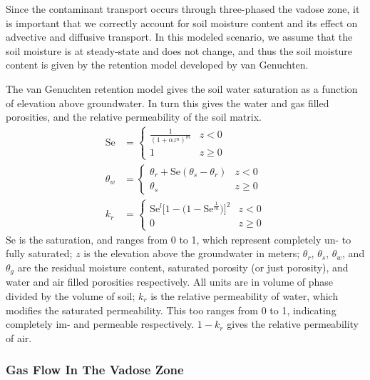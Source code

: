 Since the contaminant transport occurs through three-phased the vadose zone, it is important that we correctly account for soil moisture content and its effect on advective and diffusive transport.
In this modeled scenario, we assume that the soil moisture is at steady-state and does not change, and thus the soil moisture content is given by the retention model developed by van Genuchten.\par

The van Genuchten retention model gives the soil water saturation as a function of elevation above groundwater.
In turn this gives the water and gas filled porosities, and the relative permeability of the soil matrix.
\begin{align}
  \mathrm{Se} &=
    \begin{cases}\label{eq:van_genuchten_saturation}
      \frac{1}{(1 + \alpha z^n)^m} & z < 0 \\
    1 & z \geq 0
    \end{cases} \\
  \theta_w &=
    \begin{cases}\label{eq:van_genuchten_soil_moisture}
      \theta_r + \mathrm{Se}(\theta_s - \theta_r) & z < 0 \\
      \theta_s & z \geq 0
    \end{cases} \\
  k_r &=
    \begin{cases}\label{eq:van_genuchten_relative_permeability}
      \mathrm{Se}^l \big[ 1 - \big( 1 - \mathrm{Se}^\frac{1}{m} \big) \big]^2 & z < 0 \\
      0 & z \geq 0
    \end{cases}
\end{align}
$\mathrm{Se}$ is the saturation, and ranges from 0 to 1, which represent completely un- to fully saturated;
$z$ is the elevation above the groundwater in meters;
$\theta_r$, $\theta_s$, $\theta_w$, and $\theta_g$ are the residual moisture content, saturated porosity (or just porosity), and water and air filled porosities respectively. All units are in volume of phase divided by the volume of soil;
$k_r$ is the relative permeability of water, which modifies the saturated permeability. This too ranges from 0 to 1, indicating completely im- and permeable respectively. $1-k_r$ gives the relative permeability of air.\par

\subsubsection{Gas Flow In The Vadose Zone}\label{sec:darcy}

